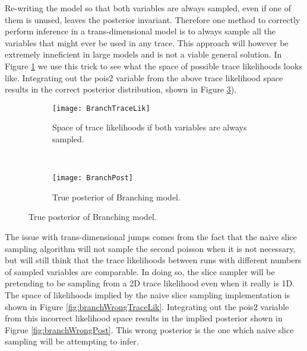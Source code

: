 Re-writing the model so that both variables are always sampled, even if one of them is unused, leaves the posterior invariant. Therefore one method to correctly perform inference in a trans-dimensional model is to always sample all the variables that might ever be used in any trace. This approach will however be extremely inneficient in large models and is not a viable general solution. In Figure \ref{fig:branchTraceLik} we use this trick to see what the space of possible trace likelihoods looks like. Integrating out the pois2 variable from the above trace likelihood space results in the correct posterior distribution, shown in Figure \ref{fig:branchPost}).

\begin{figure}[h]
        \centering
        \begin{subfigure}[b]{0.48\textwidth}
                \centering
                \texttt{[image: BranchTraceLik]}
                \caption{Space of trace likelihoods if both variables are always sampled.}
                \label{fig:branchTraceLik}
        \end{subfigure}
        ~ 
        \begin{subfigure}[b]{0.48\textwidth}
                \centering
                \texttt{[image: BranchPost]}
                \caption{True posterior of Branching model.}
                \label{fig:branchPost}
        \end{subfigure}
\end{figure}

The issue with trans-dimensional jumps comes from the fact that the naive slice sampling algorithm will not sample the second poisson when it is not necessary, but will still think that the trace likelihoods between runs with different numbers of sampled variables are comparable. In doing so, the slice sampler will be pretending to be sampling from a 2D trace likelihood even when it really is 1D. The space of likelihoods implied by the naive slice sampling implementation is shown in Figure \ref{fig:branchWrongTraceLik}. Integrating out the pois2 variable from this incorrect likelihood space results in the implied posterior shown in Figrue \ref{fig:branchWrongPost}. This wrong posterior is the one which naive slice sampling will be attempting to infer. 

